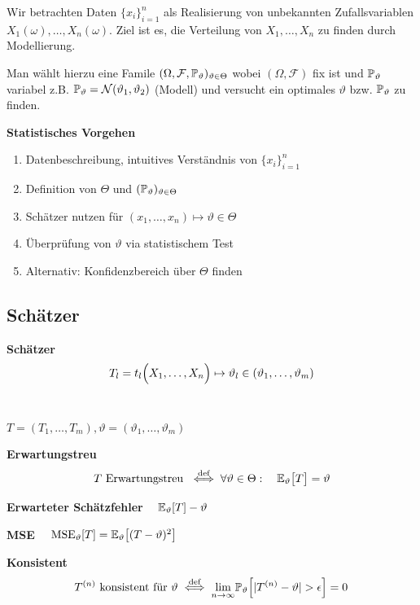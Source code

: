 Wir betrachten Daten $\{x_i\}_{i=1}^n$ als Realisierung von unbekannten Zufallsvariablen $X_1(\omega),\ldots,X_n(\omega)$.
Ziel ist es, die Verteilung von $X_1,\ldots,X_n$ zu finden durch Modellierung.

Man wählt hierzu eine Famile $(\Omega, \mathcal F, \P_\vartheta)_{\vartheta\in\Theta}$ wobei $(\Omega, \mathcal F)$ 
fix ist und $\P_\vartheta$ variabel z.B. $\P_\vartheta = \mathcal{N}(\vartheta_1, \vartheta_2)$ (Modell) und versucht ein optimales $\vartheta$ bzw. $\P_\vartheta$ zu finden.

\textbf{Statistisches Vorgehen}
\begin{enumerate}
    \item Datenbeschreibung, intuitives Verständnis von $\{x_i\}_{i=1}^n$
    \item Definition von $\Theta$ und $(\P_\vartheta)_{\vartheta\in\Theta}$
    \item Schätzer nutzen für $(x_1,\ldots,x_n)\mapsto\vartheta\in\Theta$
    \item Überprüfung von $\vartheta$ via statistischem Test
    \item Alternativ: Konfidenzbereich über $\Theta$ finden
\end{enumerate}

\subsection{Schätzer}

 \textbf{Schätzer} 
$$
    T_l = t_l\Bigl( X_1,\ldots,X_n \Bigr) \mapsto \vartheta_l \in (\vartheta_1,\ldots,\vartheta_m) 
$$
\\

{\footnotesize
    \notation $T = (T_1,\ldots,T_m), \vartheta = (\vartheta_1,\ldots,\vartheta_m)$
}

 \textbf{Erwartungstreu} 
$$
    T \text{ Erwartungstreu } \iffdef \forall \vartheta \in \Theta:\quad \E_\vartheta\bigl[ T \bigr] = \vartheta
$$

 \textbf{Erwarteter Schätzfehler} $\quad\E_\vartheta[T] - \vartheta$ 

 \textbf{MSE} $\quad\text{MSE}_\vartheta[T] = \E_\vartheta\bigl[ (T-\vartheta)^2 \bigr]$ 

 \textbf{Konsistent}
$$
    T^{(n)} \text{ konsistent für } \vartheta \iffdef \underset{n\to\infty}{\lim}\P_\vartheta \Bigl[ \vert T^{(n)}-\vartheta \vert > \epsilon \Bigr] = 0
$$

